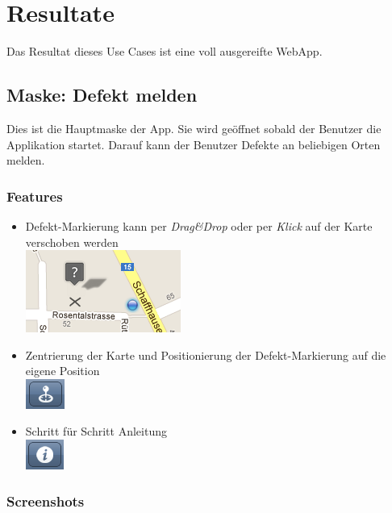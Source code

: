 \section{Resultate}
Das Resultat dieses Use Cases ist eine voll ausgereifte \gls{WebApp}.

\subsection{Maske: Defekt melden}
Dies ist die Hauptmaske der App. Sie wird geöffnet sobald der Benutzer die Applikation startet. Darauf kann der Benutzer Defekte an beliebigen Orten melden.

\subsubsection{Features}
\begin{itemize}
\item Defekt-Markierung kann per \emph{Drag\&Drop} oder per \emph{Klick} auf der Karte verschoben werden \\ \includegraphics{images/usecase2-fixmystreet/features/features-report-drag_and_drop}
\item Zentrierung der Karte und Positionierung der Defekt-Markierung auf die eigene Position \\ \includegraphics{images/usecase2-fixmystreet/features/features-report-center_map_button}
\item Schritt für Schritt Anleitung \\ \includegraphics{images/usecase2-fixmystreet/features/features-report-info_button}
\end{itemize}

\subsubsection{Screenshots}

